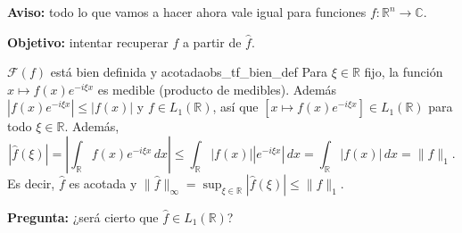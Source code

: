 \textbf{Aviso:} todo lo que vamos a hacer ahora vale igual para funciones $f : \mathbb{R}^n \to \mathbb{C}$.

\textbf{Objetivo:} intentar recuperar $f$ a partir de $\hat{f}$.

\begin{observacion}{$\mathcal{F}(f)$ está bien definida y acotada}{obs_tf_bien_def}
Para $\xi \in \mathbb{R}$ fijo, la función $x \mapsto f(x)e^{-i\xi x}$ es medible (producto de medibles). Además $|f(x)e^{-i\xi x}| \le |f(x)|$ y $f \in L_1(\mathbb{R})$, así que $[x \mapsto f(x)e^{-i\xi x}] \in L_1(\mathbb{R})$ para todo $\xi \in \mathbb{R}$. Además,
\[
|\hat{f}(\xi)| = \left|\int_{\mathbb{R}}f(x)e^{-i\xi x}\,dx\right| \le \int_{\mathbb{R}}|f(x)||e^{-i\xi x}|\,dx = \int_{\mathbb{R}}|f(x)|\,dx = \|f\|_1.
\]
Es decir, $\hat{f}$ es acotada y $\|\hat{f}\|_\infty = \sup_{\xi\in\mathbb{R}}|\hat{f}(\xi)| \le \|f\|_1$.
\end{observacion}

\textbf{Pregunta:} ¿será cierto que $\hat{f} \in L_1(\mathbb{R})$?

